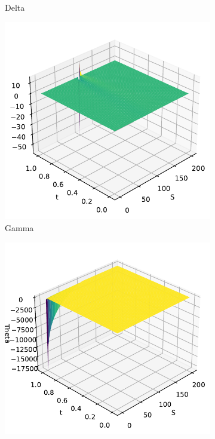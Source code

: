 \begin{figure}[H]
\begin{subfigure}[b]{0.3\linewidth}
        \caption{Delta}
    \end{subfigure}
    \begin{subfigure}[b]{0.3\linewidth}
        \includegraphics[width=\linewidth]{Imagenes/Parte1/6_Sols/Binary_Put/Binary_Put_Gamma.pdf}
        \caption{Gamma}
    \end{subfigure}
    \begin{subfigure}[b]{0.3\linewidth}
        \includegraphics[width=\linewidth]{Imagenes/Parte1/6_Sols/Binary_Put/Binary_Put_Theta.pdf}

\end{subfigure}
\end{figure}
